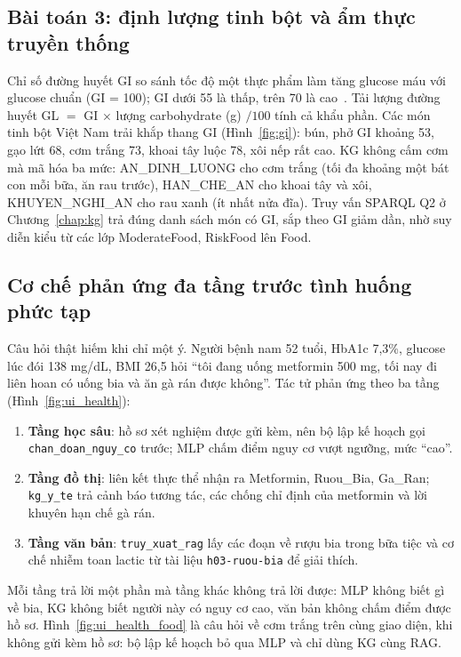 \subsection{Bài toán 3: định lượng tinh bột và ẩm thực truyền thống}
Chỉ số đường huyết GI so sánh tốc độ một thực phẩm làm tăng glucose máu với glucose chuẩn (GI = 100); GI dưới 55
là thấp, trên 70 là cao~\cite{atkinson2008gi}. Tải lượng đường huyết GL $=$ GI $\times$ lượng carbohydrate (g) $/
100$ tính cả khẩu phần. Các món tinh bột Việt Nam trải khắp thang GI (Hình~\ref{fig:gi}): bún, phở GI khoảng 53, gạo
lứt 68, cơm trắng 73, khoai tây luộc 78, xôi nếp rất cao. KG không cấm cơm mà mã hóa ba mức: \textsf{AN\_DINH\_LUONG}
cho cơm trắng (tối đa khoảng một bát con mỗi bữa, ăn rau trước), \textsf{HAN\_CHE\_AN} cho khoai tây và xôi,
\textsf{KHUYEN\_NGHI\_AN} cho rau xanh (ít nhất nửa đĩa). Truy vấn SPARQL Q2 ở Chương~\ref{chap:kg} trả đúng danh
sách món có GI, sắp theo GI giảm dần, nhờ suy diễn kiểu từ các lớp \textsf{ModerateFood}, \textsf{RiskFood} lên
\textsf{Food}.


\subsection{Cơ chế phản ứng đa tầng trước tình huống phức tạp}
Câu hỏi thật hiếm khi chỉ một ý. Người bệnh nam 52 tuổi, HbA1c 7,3\%, glucose lúc đói 138 mg/dL, BMI 26,5 hỏi
``tôi đang uống metformin 500 mg, tối nay đi liên hoan có uống bia và ăn gà rán được không''. Tác tử phản ứng theo
ba tầng (Hình~\ref{fig:ui_health}):

\begin{enumerate}
  \item \textbf{Tầng học sâu}: hồ sơ xét nghiệm được gửi kèm, nên bộ lập kế hoạch gọi \texttt{chan\_doan\_nguy\_co}
        trước; MLP chấm điểm nguy cơ vượt ngưỡng, mức ``cao''.
  \item \textbf{Tầng đồ thị}: liên kết thực thể nhận ra \textsf{Metformin}, \textsf{Ruou\_Bia}, \textsf{Ga\_Ran};
        \texttt{kg\_y\_te} trả cảnh báo tương tác, các chống chỉ định của metformin và lời khuyên hạn chế gà rán.
  \item \textbf{Tầng văn bản}: \texttt{truy\_xuat\_rag} lấy các đoạn về rượu bia trong bữa tiệc và cơ chế nhiễm toan
        lactic từ tài liệu \texttt{h03-ruou-bia} để giải thích.
\end{enumerate}

Mỗi tầng trả lời một phần mà tầng khác không trả lời được: MLP không biết gì về bia, KG không biết người này có
nguy cơ cao, văn bản không chấm điểm được hồ sơ. Hình~\ref{fig:ui_health_food} là câu hỏi về cơm trắng trên cùng
giao diện, khi không gửi kèm hồ sơ: bộ lập kế hoạch bỏ qua MLP và chỉ dùng KG cùng RAG.

